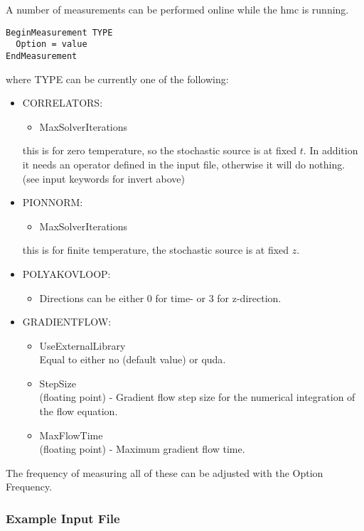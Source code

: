 A number of measurements can be performed online while the hmc is
running. 
\begin{verbatim}
BeginMeasurement TYPE
  Option = value
EndMeasurement
\end{verbatim}
where {\ttfamily TYPE} can be currently one of the following:
\begin{itemize}
\item {\ttfamily CORRELATORS}:
  \begin{itemize}
  \item {\ttfamily MaxSolverIterations}
  \end{itemize}
  this is for zero temperature, so the stochastic source is at fixed
  $t$. In addition it needs an operator defined in the input file,
  otherwise it will do nothing. (see input keywords for {\ttfamily invert} above)
\item {\ttfamily PIONNORM}:
  \begin{itemize}
  \item {\ttfamily MaxSolverIterations}
  \end{itemize}
  this is for finite temperature, the stochastic source is at fixed $z$.

\item {\ttfamily POLYAKOVLOOP}:
  \begin{itemize}
  \item {\ttfamily Directions} can be either $0$ for time- or $3$ for z-direction.
  \end{itemize}

\item {\ttfamily GRADIENTFLOW}:
  \begin{itemize}
    \item {\ttfamily UseExternalLibrary} \\
    Equal to either {\ttfamily no} (default value) or {\ttfamily quda}.
    \item {\ttfamily StepSize} \\
    ({\ttfamily floating point}) - Gradient flow step size for the numerical integration of the flow equation.
    \item {\ttfamily MaxFlowTime} \\
    ({\ttfamily floating point}) - Maximum gradient flow time.
  \end{itemize}

\end{itemize}
The frequency of measuring all of these can be adjusted with the
Option {\ttfamily Frequency}. 


\subsubsection{Example Input File}

